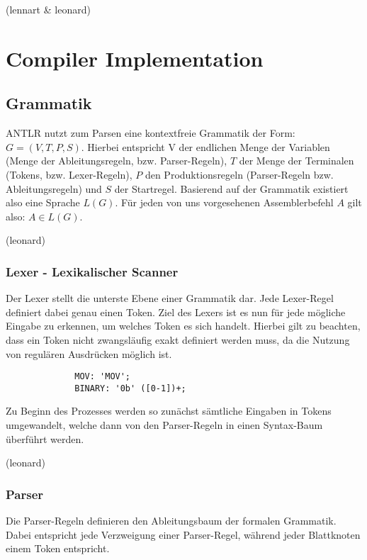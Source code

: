 \documentclass[paper=a4,fontsize=12pt,twocolumn]{scrreprt}
\begin{document}
(lennart \& leonard)


\section{Compiler Implementation}

\subsection{Grammatik}
ANTLR nutzt zum Parsen eine kontextfreie Grammatik der Form: $G = (V, T, P, S)$.
Hierbei entspricht V der endlichen Menge der Variablen (Menge der Ableitungsregeln, bzw. Parser-Regeln), $T$ der Menge der Terminalen (Tokens, bzw. Lexer-Regeln), $P$ den Produktionsregeln (Parser-Regeln bzw. Ableitungsregeln) und $S$ der Startregel.
Basierend auf der Grammatik existiert also eine Sprache $L(G)$. Für jeden von uns vorgesehenen Assemblerbefehl $A$ gilt also: $A \in L(G)$. 

(leonard)

\subsubsection{Lexer - Lexikalischer Scanner}
Der Lexer stellt die unterste Ebene einer Grammatik dar.
Jede Lexer-Regel definiert dabei genau einen Token.
Ziel des Lexers ist es nun für jede mögliche Eingabe zu erkennen, um welches Token es sich handelt.
Hierbei gilt zu beachten, dass ein Token nicht zwangsläufig exakt definiert werden muss, da die Nutzung von regulären Ausdrücken möglich ist.

\begin{figure}[h]
    \begin{lstlisting}
        MOV: 'MOV';
        BINARY: '0b' ([0-1])+;
    \end{lstlisting}
\end{figure}

Zu Beginn des Prozesses werden so zunächst sämtliche Eingaben in Tokens umgewandelt, welche dann von den Parser-Regeln in einen Syntax-Baum überführt werden.

(leonard)

\subsubsection{Parser}
Die Parser-Regeln definieren den Ableitungsbaum der formalen Grammatik.
Dabei entspricht jede Verzweigung einer Parser-Regel, während jeder Blattknoten einem Token entspricht.
\end{document}
